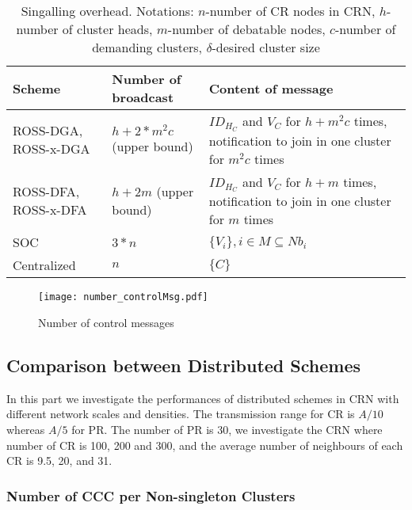 \begin{table}[hc]
\center
\begin{tabular}{|p{3 cm}|p{3 cm}|p{7.5 cm}|}
\hline
 Scheme 		&   Number of broadcast  	& Content of message \\ \hline
 ROSS-DGA, ROSS-x-DGA 		&   $h+2*m^2c$  (upper bound)				& $ID_{H_C}$ and $V_C$ for $h+m^2c$ times, notification to join in one cluster for $m^2c$ times					\\ \hline
 ROSS-DFA, ROSS-x-DFA 		&   $h+ 2m$	 (upper bound)				& $ID_{H_C}$ and $V_C$ for $h+m$ times, notification to join in one cluster for $m$ times	 					\\ \hline
 SOC 			&   $3*n$					& $\{V_i\}, i\in M\subseteq Nb_i$						\\ \hline
 Centralized	&	$n$						& $\{C\}$         	\\ \hline
\end{tabular}
\caption{Singalling overhead. Notations: $n$-number of CR nodes in CRN, $h$-number of cluster heads, $m$-number of debatable nodes, $c$-number of demanding clusters, $\delta$-desired cluster size}
\label{tab_overhead}
\end{table}


\begin{figure}[ht!]
  \centering
  \texttt{[image: number\_controlMsg.pdf]}
  \caption{Number of control messages}
  \label{control_msg}
\end{figure}


\subsection{Comparison between Distributed Schemes}
In this part we investigate the performances of distributed schemes in CRN with different network scales and densities.
The transmission range for CR is $A/10$ whereas $A/5$ for PR.
The number of PR is 30, we investigate the CRN where number of CR is 100, 200 and 300, and the average number of neighbours of each CR is 9.5, 20, and 31.


\subsubsection*{Number of CCC per Non-singleton Clusters}

